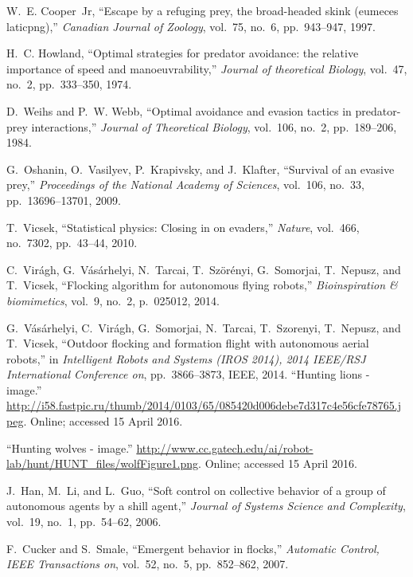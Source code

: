 \documentclass[12pt,a4paper,final]{iopart}
\begin{document}
\begin{thebibliography}{10}
W.~E. Cooper~Jr, ``Escape by a refuging prey, the broad-headed skink (eumeces
laticpng),'' {\em Canadian Journal of Zoology}, vol.~75, no.~6, pp.~943--947,
1997.

H.~C. Howland, ``Optimal strategies for predator avoidance: the relative
importance of speed and manoeuvrability,'' {\em Journal of theoretical
Biology}, vol.~47, no.~2, pp.~333--350, 1974.

D.~Weihs and P.~W. Webb, ``Optimal avoidance and evasion tactics in
predator-prey interactions,'' {\em Journal of Theoretical Biology}, vol.~106,
no.~2, pp.~189--206, 1984.

G.~Oshanin, O.~Vasilyev, P.~Krapivsky, and J.~Klafter, ``Survival of an evasive
prey,'' {\em Proceedings of the National Academy of Sciences}, vol.~106,
no.~33, pp.~13696--13701, 2009.

T.~Vicsek, ``Statistical physics: Closing in on evaders,'' {\em Nature},
vol.~466, no.~7302, pp.~43--44, 2010.

C.~Vir{\'a}gh, G.~V{\'a}s{\'a}rhelyi, N.~Tarcai, T.~Sz{\"o}r{\'e}nyi,
G.~Somorjai, T.~Nepusz, and T.~Vicsek, ``Flocking algorithm for autonomous
flying robots,'' {\em Bioinspiration \& biomimetics}, vol.~9, no.~2,
p.~025012, 2014.

G.~V{\'a}s{\'a}rhelyi, C.~Vir{\'a}gh, G.~Somorjai, N.~Tarcai, T.~Szorenyi,
T.~Nepusz, and T.~Vicsek, ``Outdoor flocking and formation flight with
autonomous aerial robots,'' in {\em Intelligent Robots and Systems (IROS
2014), 2014 IEEE/RSJ International Conference on}, pp.~3866--3873, IEEE,
2014.
``Hunting lions - image.''
\url{http://i58.fastpic.ru/thumb/2014/0103/65/085420d006debe7d317c4e56cfe78765.jpeg}.
\newblock Online; accessed 15 April 2016.

``Hunting wolves - image.''
\url{http://www.cc.gatech.edu/ai/robot-lab/hunt/HUNT\_files/wolfFigure1.png}.
\newblock Online; accessed 15 April 2016.

J.~Han, M.~Li, and L.~Guo, ``Soft control on collective behavior of a group of
autonomous agents by a shill agent,'' {\em Journal of Systems Science and
Complexity}, vol.~19, no.~1, pp.~54--62, 2006.

F.~Cucker and S.~Smale, ``Emergent behavior in flocks,'' {\em Automatic
Control, IEEE Transactions on}, vol.~52, no.~5, pp.~852--862, 2007.


\end{thebibliography}
\end{document}
